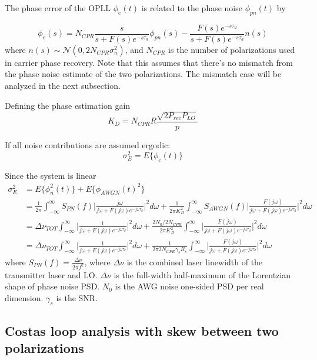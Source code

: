 \documentclass[a4paper]{article}
\begin{document}
The phase error of the OPLL $\phi_e(t)$ is related to the phase noise $\phi_{pn}(t)$ by

\begin{equation}
\phi_e(s) = N_{CPR}\frac{s}{s + F(s)e^{-s\tau_d}}\phi_{pn}(s) - \frac{F(s)e^{-s\tau_d}}{s + F(s)e^{-s\tau_d}}n(s)
\end{equation}
where $n(s) \sim\mathcal{N}(0, 2N_{CPR}\sigma_n^2)$, and $N_{CPR}$ is the number of polarizations used in carrier phase recovery. Note that this assumes that there's no mismatch from the phase noise estimate of the two polarizations. The mismatch case will be analyzed in the next subsection.

Defining the phase estimation gain
\begin{equation}
K_D = N_{CPR}R\frac{\sqrt{2P_{rec}P_{LO}}}{p}
\end{equation}

If all noise contributions are assumed ergodic:
\begin{equation}
\sigma_E^2 = E\{\phi_e(t)\}
\end{equation}

Since the system is linear
\begin{align} \nonumber
\sigma_E^2 &= E\{\phi_n^2(t)\} + E\{\phi_{AWGN}(t)^2\} \\ \nonumber
&= \frac{1}{2\pi}\int_{-\infty}^\infty S_{PN}(f)\bigg|\frac{j\omega}{j\omega + F(j\omega)e^{-j\omega\tau_d}}\bigg|^2d\omega + \frac{1}{2\pi K_D^2}\int_{-\infty}^\infty S_{AWGN}(f)\bigg|\frac{F(j\omega)}{j\omega + F(j\omega)e^{-j\omega\tau_d}}\bigg|^2d\omega \\ \nonumber
&= \Delta\nu_{TOT}\int_{-\infty}^\infty \bigg|\frac{1}{j\omega + F(j\omega)e^{-j\omega\tau_d}}\bigg|^2d\omega + \frac{2N_0/2N_{CPR}}{2\pi K_D^2}\int_{-\infty}^\infty \bigg|\frac{F(j\omega)}{j\omega + F(j\omega)e^{-j\omega\tau_d}}\bigg|^2d\omega \\
&= \Delta\nu_{TOT}\int_{-\infty}^\infty \bigg|\frac{1}{j\omega + F(j\omega)e^{-j\omega\tau_d}}\bigg|^2d\omega + \frac{1}{2\pi 2N_{CPR}\gamma_sR_s}\int_{-\infty}^\infty \bigg|\frac{F(j\omega)}{j\omega + F(j\omega)e^{-j\omega\tau_d}}\bigg|^2d\omega \nonumber
\end{align}
where $S_{PN}(f) = \frac{\Delta\nu}{2\pi f^2}$, where $\Delta\nu$ is the combined laser linewidth of the transmitter laser and LO.  $\Delta\nu$ is the full-width half-maximum of the Lorentzian shape of phase noise PSD. $N_0$ is the AWG noise one-sided PSD per real dimension. $\gamma_s$ is the SNR.

\subsection{Costas loop analysis with skew between two polarizations}
\end{document}
